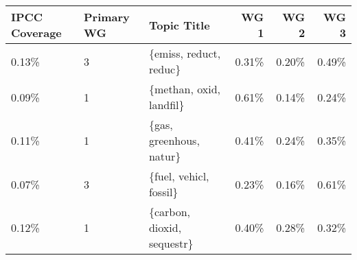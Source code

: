 \begin{tabular}{p{1.4cm} p{1cm} l r r r}
\toprule
 IPCC Coverage &  Primary WG &                 Topic Title &  WG 1 &  WG 2 &  WG 3 \\
\midrule
         0.13\% &           3 &      \{emiss, reduct, reduc\} & 0.31\% & 0.20\% & 0.49\% \\
         0.09\% &           1 &     \{methan, oxid, landfil\} & 0.61\% & 0.14\% & 0.24\% \\
         0.11\% &           1 &     \{gas, greenhous, natur\} & 0.41\% & 0.24\% & 0.35\% \\
         0.07\% &           3 &      \{fuel, vehicl, fossil\} & 0.23\% & 0.16\% & 0.61\% \\
         0.12\% &           1 &  \{carbon, dioxid, sequestr\} & 0.40\% & 0.28\% & 0.32\% \\
\bottomrule
\end{tabular}
